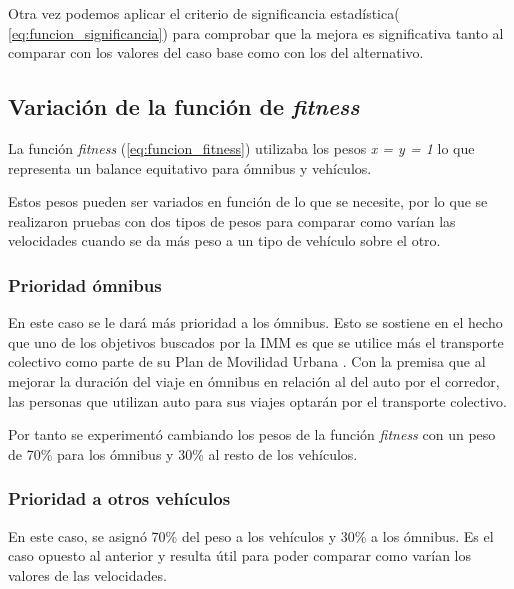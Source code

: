 Otra vez podemos aplicar el criterio de significancia estadística( \ref{eq:funcion_significancia}) para comprobar que la mejora es significativa tanto al comparar con los valores del caso base como con los del alternativo.

\subsection{Variación de la función de \emph{fitness}}

La función \emph{fitness} (\ref{eq:funcion_fitness}) utilizaba los pesos \emph{x = y = 1} lo que representa un balance equitativo  para ómnibus y vehículos.


Estos pesos pueden ser variados en función de lo que se necesite, por lo que se realizaron pruebas con dos tipos de pesos para comparar como varían las velocidades cuando se da más peso a un tipo de vehículo sobre el otro.


\subsubsection{Prioridad ómnibus}
En este caso se le dará más prioridad a los ómnibus. Esto se sostiene en el hecho que uno de los objetivos buscados por la IMM  es que se utilice más el transporte colectivo como parte de su Plan de Movilidad Urbana \citep{PlanMovilidad}. Con la premisa que al mejorar la duración del viaje en ómnibus en relación al del auto por el corredor, las personas que utilizan auto para sus viajes optarán por el transporte colectivo.

Por tanto se experimentó cambiando los pesos de la función \emph{fitness} con un peso de 70\% para los ómnibus y 30\% al resto de los vehículos.


\subsubsection{Prioridad a otros vehículos}

En este caso, se asignó 70\% del peso a los vehículos y 30\% a los ómnibus. Es el caso opuesto al anterior y resulta útil para poder comparar como varían los valores de las velocidades.

